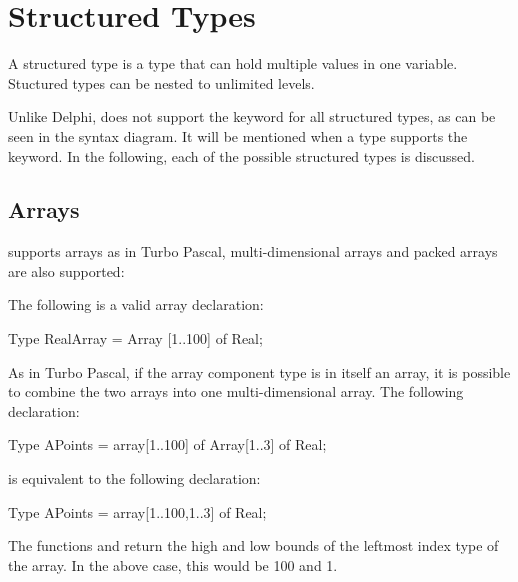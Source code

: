 \documentclass{report}
\begin{document}
\section{Structured Types}
A structured type is a type that can hold multiple values in one variable.
Stuctured types can be nested to unlimited levels.

Unlike Delphi, \fpc does not support the keyword  for all
structured types, as can be seen in the syntax diagram. It will be mentioned
when a type supports the  keyword.
In the following, each of the possible structured types is discussed.
\subsection{Arrays}
\fpc supports arrays as in Turbo Pascal, multi-dimensional arrays 
and packed arrays are also supported:

The following is a valid array declaration:
\begin{listing}
Type 
  RealArray = Array [1..100] of Real;
\end{listing}
As in Turbo Pascal, if the array component type is in itself an array, it is
possible to combine the two arrays into one multi-dimensional array. The
following declaration:
\begin{listing}
Type 
   APoints = array[1..100] of Array[1..3] of Real;
\end{listing}
is equivalent to the following declaration:
\begin{listing}
Type 
   APoints = array[1..100,1..3] of Real;
\end{listing}
The functions  and  return the high and low bounds of
the leftmost index type of the array. In the above case, this would be 100 
and 1.
\end{document}
